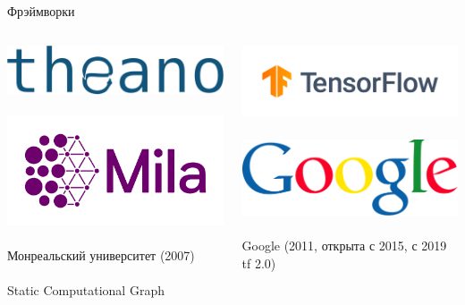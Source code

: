\documentclass[notes,12pt, aspectratio=169]{beamer}
\begin{document}
\begin{frame}{Фрэймворки}
\begin{columns}[T] %
	\begin{column}{.33\textwidth}
		\centering 	\includegraphics[width=.6\linewidth]{theano.png} \\
		\mbox{ } \\
		\centering 	\includegraphics[width=.6\linewidth]{Logo_Mila.png} \\
		\mbox{ } \\
		Монреальский университет (2007) \\ 
		\mbox{ } \\
		Static Computational Graph 
	\end{column}%
	\hfill%
	\begin{column}{.33\textwidth}
		\centering 	\includegraphics[width=.7\linewidth]{tensorflow.png} \\
		\mbox{ } \\
		\centering 	\includegraphics[width=.6\linewidth]{google.png} \\
		\mbox{ } \\	
		Google (2011, открыта с 2015, с 2019 tf 2.0) \\ 

\end{column}
\end{columns}
\end{frame}
\end{document}
